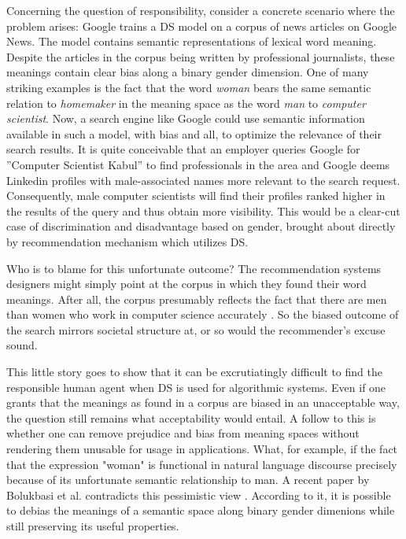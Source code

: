 \documentclass{article}
\begin{document}
Concerning the question of responsibility, consider a concrete scenario where the problem arises: Google trains a DS model on a corpus of news articles on Google News. The model contains semantic representations of lexical word meaning. Despite the articles in the corpus being written by professional journalists, these meanings contain clear bias along a binary gender dimension. One of many striking examples is the fact that the word \emph{woman} bears the same semantic relation to \emph{homemaker} in the meaning space as the word \emph{man} to \emph{computer scientist}. Now, a search engine like Google could use semantic information available in such a model, with bias and all, to optimize the relevance of their search results. It is quite conceivable that an employer queries Google for ''Computer Scientist Kabul'' to find professionals in the area and Google deems Linkedin profiles with male-associated names more relevant to the search request. Consequently, male computer scientists will find their profiles ranked higher in the results of the query and thus obtain more visibility. This would be a clear-cut case of discrimination and disadvantage based on gender, brought about directly by recommendation mechanism which utilizes DS.

Who is to blame for this unfortunate outcome? The recommendation systems designers might simply point at the corpus in which they found their word meanings. After all, the corpus presumably reflects the fact that there are men than women who work in computer science accurately \cite{womenincs}. So the biased outcome of the search mirrors societal structure at, or so would the recommender's excuse sound.

This little story goes to show that it can be excrutiatingly difficult to find the responsible human agent when DS is used for algorithmic systems. Even if one grants that the meanings as found in a corpus are biased in an unacceptable way, the question still remains what acceptability would entail. A follow to this is whether one can remove prejudice and bias from meaning spaces without rendering them unusable for usage in applications. What, for example, if the fact that the expression "woman" is functional in natural language discourse precisely because of its unfortunate semantic relationship to man. A recent paper by Bolukbasi et al. contradicts this pessimistic view \cite{bolukbasi2016man}. According to it, it is possible to debias the meanings of a semantic space along binary gender dimenions while still preserving its useful properties.
\end{document}
